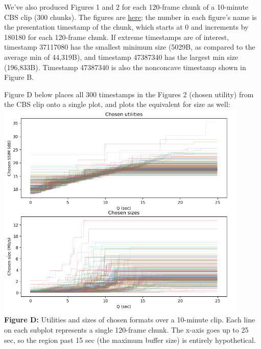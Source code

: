 \documentclass[12pt]{article}
\begin{document}
We've also produced Figures 1 and 2 for each 120-frame chunk of a 10-minute CBS clip (300 chunks). The figures are \href {https://console.cloud.google.com/storage/browser/puffer-stanford-public/BOLA/cbs}{here}; the number in each figure's name is the presentation timestamp of the chunk, which starts at 0 and increments by 180180 for each 120-frame chunk. If extreme timestamps are of interest, timestamp 37117080 has the smallest minimum size (5029B, as compared to the average min of 44,319B), and timestamp 47387340 has the largest min size (196,833B). Timestamp 47387340 is also the nonconcave timestamp shown in Figure B.
 
Figure D below places all 300 timestamps in the Figures 2 (chosen utility) from the CBS clip onto a single plot, and plots the equivalent for size as well:\\
\includegraphics[width=0.9\textwidth]{shared_decisions_2.png} \\

\textbf{Figure D:} Utilities and sizes of chosen formats over a 10-minute clip. Each line on each subplot represents a single 120-frame chunk. The x-axis goes up to 25 sec, so the region past 15 sec (the maximum buffer size) is entirely hypothetical.
 
\end{document}
